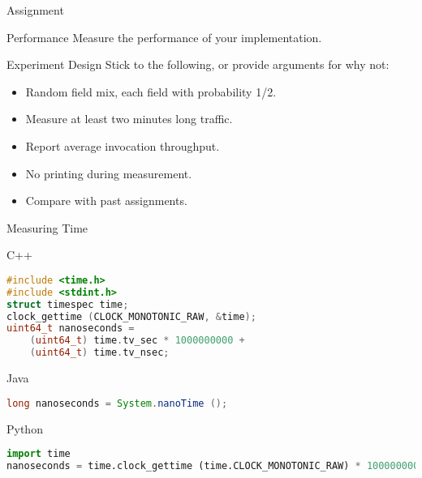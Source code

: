 \begin{frame}{Assignment}
    \begin{block}{Performance}
        Measure the performance of your implementation.
    \end{block}

    \bigskip

    \begin{block}{Experiment Design}
        Stick to the following, or provide arguments for why not:
        \begin{itemize}
            \item Random field mix, each field with probability 1/2.
            \item Measure at least two minutes long traffic.
            \item Report average invocation throughput.
            \item No printing during measurement.
            \item Compare with past assignments.
        \end{itemize}
    \end{block}
\end{frame}


\begin{frame}[fragile]{Measuring Time}
    \begin{block}{C++}
\begin{lstlisting}[language=c,style=mini]
#include <time.h>
#include <stdint.h>
struct timespec time;
clock_gettime (CLOCK_MONOTONIC_RAW, &time);
uint64_t nanoseconds =
    (uint64_t) time.tv_sec * 1000000000 +
    (uint64_t) time.tv_nsec;
\end{lstlisting}
    \end{block}
    \begin{block}{Java}
\begin{lstlisting}[language=java,style=mini]
long nanoseconds = System.nanoTime ();
\end{lstlisting}
    \end{block}
    \begin{block}{Python}
\begin{lstlisting}[language=python,style=mini]
import time
nanoseconds = time.clock_gettime (time.CLOCK_MONOTONIC_RAW) * 1000000000
\end{lstlisting}
    \end{block}
\end{frame}
